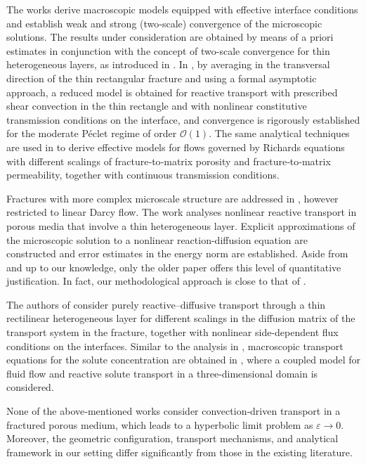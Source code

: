 \documentclass[reqno]{amsart}            %
\numberwithin{equation}{section}
\begin{document}
	The works \cite{Gahn-Radu-2018,Gahn-Jag-Radu-2022,Gahn-Radu-2025,Gahn-2025,Freud-Eden-2024,Freud-Eden-2025} derive macroscopic models equipped with effective interface conditions and establish weak and strong (two‑scale) convergence of the microscopic solutions. 
	The results under consideration are obtained by means of a priori estimates in conjunction with the concept of two-scale convergence for thin heterogeneous layers, as introduced in \cite{Neuss-Jaeger-2007}. 
	In \cite{Pop-Bog-Kum-2017}, by averaging in the transversal direction of the thin rectangular fracture  and using a formal asymptotic approach, a reduced model is obtained for reactive transport with prescribed shear convection in the thin rectangle and with nonlinear constitutive transmission conditions on the interface, and convergence is rigorously established  for the moderate P\'eclet regime of order $\mathcal{O}(1).$ The same analytical techniques are used in \cite{Lis-Kum-Pop-Rad-2020} to derive effective models for flows governed by Richards equations with different scalings of fracture‑to‑matrix porosity and fracture‑to‑matrix permeability, together with continuous transmission conditions.
	
	Fractures with more complex microscale structure are addressed  in \cite{Hoerl-Rohde-2024}, however restricted to  linear Darcy flow. The work  \cite{Gahn-Jag-Radu-2021}  analyses   nonlinear reactive transport in  porous media that involve a  thin heterogeneous layer. Explicit approximations of the microscopic solution to a nonlinear reaction-diffusion equation are constructed and error estimates in the energy norm are established. Aside from \cite{Gahn-Jag-Radu-2021} and up to our knowledge, only the older paper \cite{Pan-1981} offers this level of quantitative justification. In fact, our methodological approach is 
	close to that of \cite{Gahn-Jag-Radu-2021,Pan-1981}.
	 
	The authors of  \cite{Gahn-Radu-2018} consider  purely reactive–diffusive transport through a thin rectilinear heterogeneous layer for different scalings  in the diffusion matrix of the  transport system in the fracture, together with nonlinear side-dependent flux conditions on the interfaces.
	Similar to the analysis in \cite{Gahn-Radu-2018}, macroscopic transport equations for the solute concentration are obtained in \cite{Gahn-Radu-2025}, where a coupled model for fluid flow and reactive solute transport in a three‑dimensional domain is considered.
	
	None of the above‑mentioned works consider convection‑driven transport in a fractured porous medium, which leads to a hyperbolic limit problem as $\varepsilon \rightarrow 0.$ Moreover, the geometric configuration, transport mechanisms, and analytical framework in our setting differ significantly from those in the existing literature.
	
\end{document}
